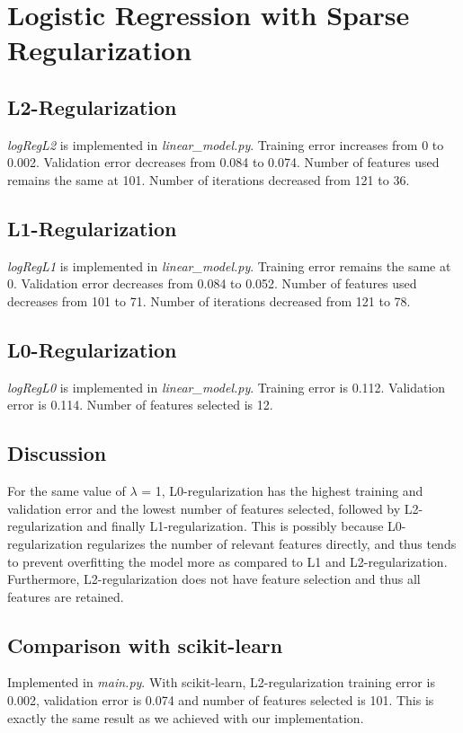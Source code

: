 \documentclass{article}
\begin{document}
\section{Logistic Regression with Sparse Regularization}
\subsection{L2-Regularization}
\emph{logRegL2} is implemented in \emph{linear\_model.py}. Training error increases from 0 to 0.002. Validation error decreases from 0.084 to 0.074. Number of features used remains the same at 101. Number of iterations decreased from 121 to 36.


\subsection{L1-Regularization}
\emph{logRegL1} is implemented in \emph{linear\_model.py}. Training error remains the same at 0. Validation error decreases from 0.084 to 0.052. Number of features used decreases from 101 to 71. Number of iterations decreased from 121 to 78.

\subsection{L0-Regularization}
\emph{logRegL0} is implemented in \emph{linear\_model.py}. Training error is 0.112. Validation error is 0.114. Number of features selected is 12.


\subsection{Discussion}
For the same value of $\lambda$ = 1, L0-regularization has the highest training and validation error and the lowest number of features selected, followed by L2-regularization and finally L1-regularization. This is possibly because L0-regularization regularizes the number of relevant features directly, and thus tends to prevent overfitting the model more as compared to L1 and L2-regularization. Furthermore, L2-regularization does not have feature selection and thus all features are retained. 


\subsection{Comparison with scikit-learn}
Implemented in \emph{main.py}. With scikit-learn, L2-regularization training error is 0.002, validation error is 0.074 and number of features selected is 101. This is exactly the same result as we achieved with our implementation.
\end{document}
